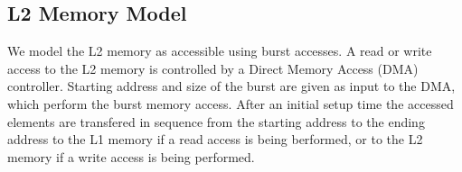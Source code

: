 \subsection{L2 Memory Model}
\label{ssec:layer2_model}
We model the L2 memory as accessible using burst accesses. 
A read or write access to the L2 memory is controlled by a Direct Memory Access (DMA) controller. Starting address and size of the burst are given as input to the DMA, which perform the burst memory access. After an initial setup time the accessed elements are transfered in sequence from the starting address to the ending address to the L1 memory if a read access is being berformed, or to the L2 memory if a write access is being performed.

